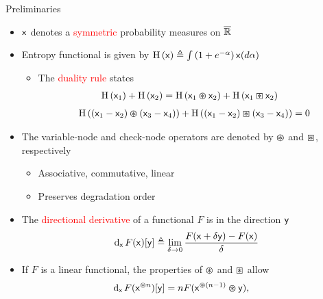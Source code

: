 \documentclass{beamer}
\newlength{\onecolwid}
\begin{document}
\begin{frame}
\begin{columns}[t]
\begin{column}{\onecolwid}
    \vspace{2cm}
    \begin{block}{\Large Preliminaries}
      \begin{itemize}
      \item\vspace{0.75cm} $\mathsf{x}$ denotes a \textcolor{red}{symmetric} probability measures on $\overline{\mathbb{R}}$
      \item\vspace{0.75cm} Entropy functional is given by $\mathrm{H} \left( \mathsf{x} \right) \triangleq \int \left( 1+e^{-\alpha} \right) \mathsf{x}(d\alpha)$
        \vspace{0.75cm}
        \begin{itemize}
        \item The \textcolor{red}{duality rule} states
          \begin{align*}
            \mathrm{H} \left( \mathsf{x}_1 \right) + \mathrm{H} \left( \mathsf{x}_2 \right) &= \mathrm{H} \left( \mathsf{x}_1 \varoast \mathsf{x}_2 \right) + \mathrm{H} \left( \mathsf{x}_1 \boxast \mathsf{x}_2 \right)
          \end{align*}
          \begin{align*}
            \mathrm{H} \left( (\mathsf{x}_1 - \mathsf{x}_2) \varoast (\mathsf{x}_3 - \mathsf{x}_4)  \right) + \mathrm{H} \left( (\mathsf{x}_1 - \mathsf{x}_2) \boxast (\mathsf{x}_3 - \mathsf{x}_4)  \right) = 0
          \end{align*}
        \end{itemize}
        
      \item\vspace{0.75cm} The variable-node and check-node operators are denoted by $\varoast$ and $\boxast$, respectively
        \begin{itemize}
          \vspace{0.5cm} \item Associative, commutative, linear
          \vspace{0.5cm} \item Preserves degradation order
        \end{itemize}
        
      \item\vspace{0.75cm} The \textcolor{red}{directional derivative} of a functional $F$ is in the direction $\mathsf{y}$
        \begin{align*}
          \mathrm{d}_{ \mathsf{x} }\hspace{0.05cm} F(\mathsf{x})[\mathsf{y}] \triangleq \lim_{\delta \rightarrow 0} \frac{F(\mathsf{x} + \delta \mathsf{y} ) - F(\mathsf{x})}{\delta} 
        \end{align*}
        
      \item\vspace{0.75cm} If $F$ is a linear functional, the properties of $\varoast$ and $\boxast$ allow
        \begin{align*}
          \mathrm{d}_{ \mathsf{x} }\hspace{0.05cm} F(\mathsf{x}^{\varoast n})[\mathsf{y}] &= n F( \mathsf{x}^{\varoast (n-1)} \varoast \mathsf{y} ) ,
        \end{align*}
      \end{itemize}
    \end{block}
  \end{column}


\end{columns}
\end{frame}
\end{document}
